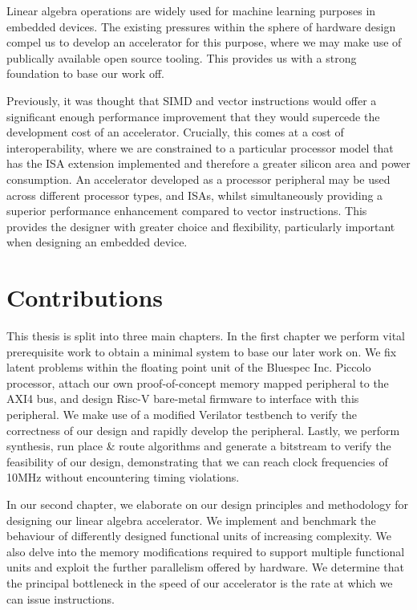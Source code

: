 \documentclass[a4paper,8pt]{report}
\begin{document}
Linear algebra operations are widely used for machine learning purposes in
embedded devices. The existing pressures within the sphere of hardware design
compel us to develop an accelerator for this purpose, where we may make use of
publically available open source tooling. This provides us with a strong
foundation to base our work off.

Previously, it was thought that SIMD and vector instructions would offer a
significant enough performance improvement that they would supercede the
development cost of an accelerator. Crucially, this comes at a cost of
interoperability, where we are constrained to a particular processor model that
has the ISA extension implemented and therefore a greater silicon area and power
consumption. An accelerator developed as a processor peripheral may be used
across different processor types, and ISAs, whilst simultaneously providing a
superior performance enhancement compared to vector instructions. This provides
the designer with greater choice and flexibility, particularly important when
designing an embedded device.

\section{Contributions}
This thesis is split into three main chapters. In the first chapter we perform
vital prerequisite work to obtain a minimal system to base our later work on.
We fix latent problems within the floating point unit of the Bluespec Inc.
Piccolo processor, attach our own proof-of-concept memory mapped peripheral to
the AXI4 bus, and design Risc-V bare-metal firmware to interface with this
peripheral. We make use of a modified Verilator testbench to verify the
correctness of our design and rapidly develop the peripheral. Lastly, we perform
synthesis, run place \& route algorithms and generate a bitstream to verify the
feasibility of our design, demonstrating that we can reach clock frequencies of
10MHz without encountering timing violations.

In our second chapter, we elaborate on our design principles and methodology for
designing our linear algebra accelerator. We implement and benchmark the behaviour
of differently designed functional units of increasing complexity. We also delve
into the memory modifications required to support multiple functional units and
exploit the further parallelism offered by hardware. We determine that the
principal bottleneck in the speed of our accelerator is the rate at which we can
issue instructions.
\end{document}
